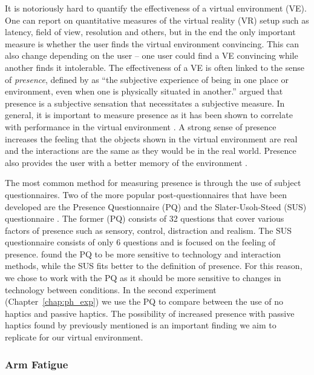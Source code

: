 It is notoriously hard to quantify the effectiveness of a virtual environment (VE).
One can report on quantitative measures of the virtual reality (VR) setup such as latency, field of view, resolution and others, but in the end the only important measure is whether the user finds the virtual environment convincing.
This can also change depending on the user -- one user could find a VE convincing while another finds it intolerable.
The effectiveness of a VE is often linked to the sense of \emph{presence}, defined by \citet{witmer_measuring_1998} as ``the subjective experience of being in one place or environment, even when one is physically situated in another.''
\citet{sheridan_musings_1992} argued that presence is a subjective sensation that necessitates a subjective measure.
In general, it is important to measure presence as it has been shown to correlate with performance in the virtual environment \citep{youngblut_relationship_2003}.
A strong sense of presence increases the feeling that the objects shown in the virtual environment are real and the interactions are the same as they would be in the real world.
Presence also provides the user with a better memory of the environment \citep{dinh_evaluating_1999}.

The most common method for measuring presence is through the use of subject questionnaires.
Two of the more popular post-questionnaires that have been developed are the Presence Questionnaire (PQ) \citep{witmer_measuring_1998} and the Slater-Usoh-Steed (SUS) questionnaire \citep{slater_depth_1994}.
The former (PQ) consists of 32 questions that cover various factors of presence such as sensory, control, distraction and realism.
The SUS questionnaire consists of only 6 questions and is focused on the feeling of presence.
\citet{nystad_comparison_2004} found the PQ to be more sensitive to technology and interaction methods, while the SUS fits better to the definition of presence.
For this reason, we chose to work with the PQ as it should be more sensitive to changes in technology between conditions.
In the second experiment (Chapter~\ref{chap:ph_exp}) we use the PQ to compare between the use of no haptics and passive haptics.
The possibility of increased presence with passive haptics found by \citet{insko_passive_2001} previously mentioned is an important finding we aim to replicate for our virtual environment.

\subsubsection{Arm Fatigue}

